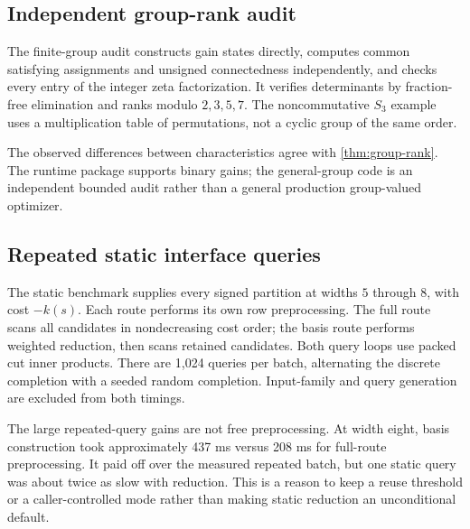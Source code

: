 \documentclass[11pt,letterpaper]{article}
\theoremstyle{definition}
\begin{document}
\subsection{Independent group-rank audit}
The finite-group audit constructs gain states directly, computes common satisfying assignments and unsigned connectedness independently, and checks every entry of the integer zeta factorization. It verifies determinants by fraction-free elimination and ranks modulo $2,3,5,7$. The noncommutative $S_3$ example uses a multiplication table of permutations, not a cyclic group of the same order.
\begin{table}[ht]
\centering\small
\caption{Exact audited ranks. The rational ranks are certified by nonzero integer determinants and the proved factorization. The four cases check 8,491 factorization entries in total.}
\label{tab:ranks}
\end{table}
The observed differences between characteristics agree with \cref{thm:group-rank}. The runtime package supports binary gains; the general-group code is an independent bounded audit rather than a general production group-valued optimizer.

\subsection{Repeated static interface queries}
The static benchmark supplies every signed partition at widths $5$ through $8$, with cost $-k(s)$. Each route performs its own row preprocessing. The full route scans all candidates in nondecreasing cost order; the basis route performs weighted reduction, then scans retained candidates. Both query loops use packed cut inner products. There are 1,024 queries per batch, alternating the discrete completion with a seeded random completion. Input-family and query generation are excluded from both timings.

\begin{table}[ht]
\centering\small
\caption{Static batches: exact state and row-probe counts. These counts do not depend on machine timing.}
\label{tab:sizes}
\end{table}
\begin{table}[ht]
\centering\scriptsize
\caption{Median milliseconds over three paired repetitions. ``Batch gain'' is full/basis total time including each route's preprocessing. ``One-query gain'' also includes preprocessing; values below one mean reduction is slower. Ratios are computed from median complete-route times, not by adding medians of separate subintervals.}
\label{tab:timings}
\end{table}
The large repeated-query gains are not free preprocessing. At width eight, basis construction took approximately 437 ms versus 208 ms for full-route preprocessing. It paid off over the measured repeated batch, but one static query was about twice as slow with reduction. This is a reason to keep a reuse threshold or a caller-controlled mode rather than making static reduction an unconditional default.
\end{document}
